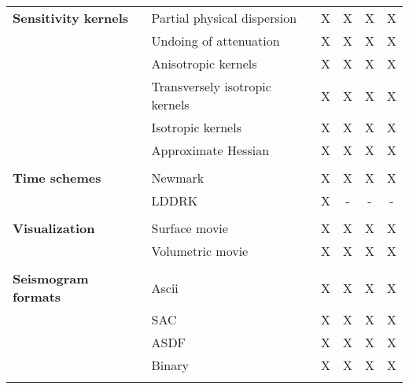 \begin{table}[htp]
\begin{center}
\begin{tabular}{ l l c c c c}
{\bf Sensitivity kernels} & Partial physical dispersion     & X  & X  & X  & X \\
                          & Undoing of attenuation          & X  & X  & X  & X \\
                          & Anisotropic kernels             & X  & X  & X  & X \\
                          & Transversely isotropic kernels  & X  & X  & X  & X \\
                          & Isotropic kernels               & X  & X  & X  & X \\
                          & Approximate Hessian             & X  & X  & X  & X \\
\hline
& & & & & \\
{\bf Time schemes}  & Newmark   & X  & X  & X  & X \\
                    & LDDRK     & X  & -  & -  & - \\
\hline
& & & & & \\
{\bf Visualization} & Surface movie     & X  & X  & X  & X \\
                    & Volumetric movie  & X  & X  & X  & X \\
\hline
& & & & & \\
{\bf Seismogram formats}  & Ascii     & X  & X  & X  & X \\
                          & SAC       & X  & X  & X  & X \\
                          & ASDF      & X  & X  & X  & X \\
                          & Binary    & X  & X  & X  & X \\
%
\hline
& & & & & \\ %
\end{tabular}
\end{center}
\end{table}


